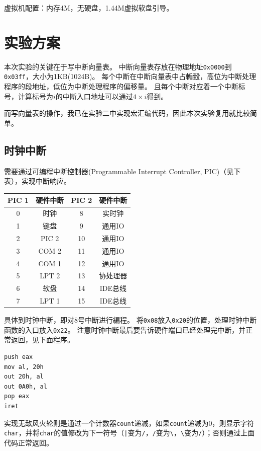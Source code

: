 \documentclass[logo,reportComp]{thesis}
\begin{document}
虚拟机配置：内存4M，无硬盘，1.44M虚拟软盘引导。

\section{实验方案}
本次实验的关键在于写中断向量表。
中断向量表存放在物理地址\verb'0x0000'到\verb'0x03ff'，大小为1KB(1024B)。
每个中断在中断向量表中占輴轂，高位为中断处理程序的段地址，低位为中断处理程序的偏移量。
且每个中断对应着一个中断标号，计算标号为$i$的中断入口地址可以通过$4\times i$得到。

而写向量表的操作，我已在实验二中实现宏汇编代码，因此本次实验复用就比较简单。

\subsection{时钟中断}
需要通过可编程中断控制器(Programmable Interrupt Controller, PIC)（见下表），实现中断响应。
\begin{center}
\begin{tabular}{cccc}\hline
PIC 1 & 硬件中断 & PIC 2 & 硬件中断\\\hline
0 & 时钟 & 8 & 实时钟\\
1 & 键盘 & 9 & 通用IO\\
2 & PIC 2 & 10 & 通用IO\\
3 & COM 2 & 11 & 通用IO\\
4 & COM 1 & 12 & 通用IO\\
5 & LPT 2 & 13 & 协处理器\\
6 & 软盘 & 14 & IDE总线\\
7 & LPT 1 & 15 & IDE总线\\\hline
\end{tabular}
\end{center}

具体到时钟中断，即对8号中断进行編程。
将\verb'0x08'放入\verb'0x20'的位置，处理时钟中断函数的入口放入\verb'0x22'。
注意时钟中断最后要告诉硬件端口已经处理完中断，并正常返回，见下面程序。
\begin{lstlisting}[language={[x86masm]Assembler}]
push eax
mov al, 20h
out 20h, al
out 0A0h, al
pop eax
iret
\end{lstlisting}

实现无敌风火轮则是通过一个计数器\verb'count'递减，如果\verb'count'递减为0，则显示字符\verb'char'，并将\verb'char'的值修改为下一符号（\verb'|'变为\verb'/'，\verb'/'变为\verb'\'，\verb'\'变为\verb'/'）；否则通过上面代码正常返回。
\end{document}
